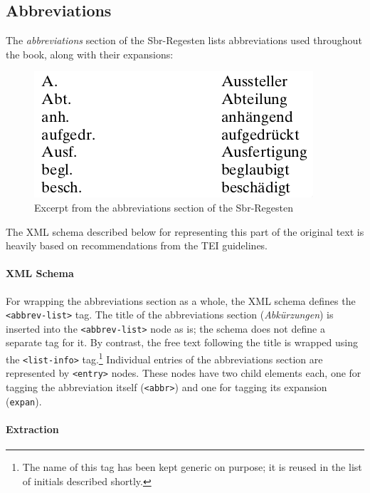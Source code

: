 \subsection{Abbreviations}
\label{sec:abbrevs}

The \emph{abbreviations} section of the Sbr-Regesten lists
abbreviations used throughout the book, along with their expansions:

\begin{figure}[h]
  \centering
  \includegraphics[scale=0.4]{img/abbrevs}
  \caption{Excerpt from the abbreviations section of the Sbr-Regesten}
  \label{fig:abbrevs}
\end{figure}

The XML schema described below for representing this part of the
original text is heavily based on recommendations from the TEI
guidelines.

\paragraph{XML Schema}

For wrapping the abbreviations section as a whole, the XML schema
defines the \texttt{<abbrev-list>} tag. The title of the abbreviations
section (\emph{Abkürzungen}) is inserted into the
\texttt{<abbrev-list>} node as is; the schema does not define a
separate tag for it. By contrast, the free text following the title is
wrapped using the \texttt{<list-info>} tag.\footnote{The name of this
  tag has been kept generic on purpose; it is reused in the list of
  initials described shortly.} Individual entries of the abbreviations
section are represented by \texttt{<entry>} nodes. These nodes have
two child elements each, one for tagging the abbreviation itself
(\texttt{<abbr>}) and one for tagging its expansion (\texttt{expan}).

\paragraph{Extraction}


